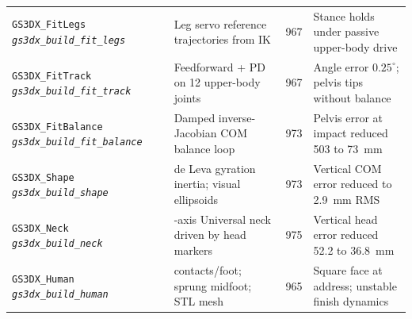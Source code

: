 \documentclass[11pt,a4paper]{article}
\begin{document}
\begin{table}[!htb]
\begin{tabularx}{\textwidth}{p{4.2cm} >{\raggedright\arraybackslash}X c >{\raggedright\arraybackslash}X}
\addlinespace[2pt]
\texttt{GS3DX\_FitLegs} \newline \textit{\texttt{gs3dx\_build\_fit\_legs}} & Leg servo reference trajectories from IK & 967 & Stance holds under passive upper-body drive \\
\addlinespace[2pt]
\texttt{GS3DX\_FitTrack} \newline \textit{\texttt{gs3dx\_build\_fit\_track}} & Feedforward + PD on 12 upper-body joints & 967 & Angle error $0.25^\circ$; pelvis tips without balance \\
\addlinespace[2pt]
\texttt{GS3DX\_FitBalance} \newline \textit{\texttt{gs3dx\_build\_fit\_balance}} & Damped inverse-Jacobian COM balance loop & 973 & Pelvis error at impact reduced 503 to 73~mm \\
\addlinespace[2pt]
\texttt{GS3DX\_Shape} \newline \textit{\texttt{gs3dx\_build\_shape}} & de Leva gyration inertia; visual ellipsoids & 973 & Vertical COM error reduced to 2.9~mm RMS \\
\addlinespace[2pt]
\texttt{GS3DX\_Neck} \newline \textit{\texttt{gs3dx\_build\_neck}} & 2-axis Universal neck driven by head markers & 975 & Vertical head error reduced 52.2 to 36.8~mm \\
\addlinespace[2pt]
\texttt{GS3DX\_Human} \newline \textit{\texttt{gs3dx\_build\_human}} & 5 contacts/foot; sprung midfoot; STL mesh & 965 & Square face at address; unstable finish dynamics \\
\bottomrule
\end{tabularx}
\end{table}
\end{document}
